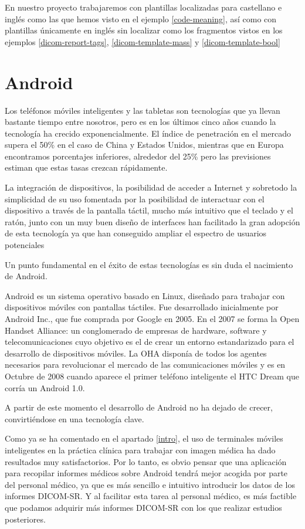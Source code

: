 En nuestro proyecto trabajaremos con plantillas localizadas para castellano e inglés como las que hemos visto en el ejemplo \ref{code-meaning}, así como con plantillas únicamente en inglés sin localizar como los fragmentos vistos en los ejemplos \ref{dicom-report-tags}, \ref{dicom-template-mass} y \ref{dicom-template-bool}

\section{Android}
Los teléfonos móviles inteligentes y las tabletas son tecnologías que ya llevan bastante tiempo entre nosotros, pero es en los últimos cinco años cuando la tecnología ha crecido exponencialmente. El índice de penetración en el mercado supera el 50\% en el caso de China y Estados Unidos, mientras que en Europa encontramos porcentajes inferiores, alrededor del 25\% pero las previsiones estiman que estas tasas crezcan rápidamente.\cite{wiki:smartphones}\par
La integración de dispositivos, la posibilidad de acceder a Internet y sobretodo la simplicidad de su uso fomentada por la posibilidad de interactuar con el dispositivo a través de la pantalla táctil, mucho más intuitivo que el teclado y el ratón, junto con un muy buen diseño de interfaces han facilitado la gran adopción de esta tecnología ya que han conseguido ampliar el espectro de usuarios potenciales\medskip\par

Un punto fundamental en el éxito de estas tecnologías es sin duda el nacimiento de Android.\par
Android es un sistema operativo basado en Linux, diseñado para trabajar con dispositivos móviles con pantallas táctiles. Fue desarrollado inicialmente por Android Inc., que fue comprada por Google en 2005. En el 2007 se forma la Open Handset Alliance: un conglomerado de empresas de hardware, software y telecomunicaciones cuyo objetivo es el de crear un entorno estandarizado para el desarrollo de dispositivos móviles. La OHA disponía de todos los agentes necesarios para revolucionar el mercado de las comunicaciones móviles y es en Octubre de 2008 cuando aparece el primer teléfono inteligente el HTC Dream que corría un Android 1.0.\cite{wiki:android}\medskip\par

A partir de este momento el desarrollo de Android no ha dejado de crecer, convirtiéndose en una tecnología clave.\par
Como ya se ha comentado en el apartado \ref{intro}, el uso de terminales móviles inteligentes en la práctica clínica para trabajar con imagen médica ha dado resultados muy satisfactorios. Por lo tanto, es obvio pensar que una aplicación para recopilar informes médicos sobre Android tendrá mejor acogida por parte del personal médico, ya que es más sencillo e intuitivo introducir los datos de los informes DICOM-SR. Y al facilitar esta tarea al personal médico, es más factible que podamos adquirir más informes DICOM-SR con los que realizar estudios posteriores.\par 

